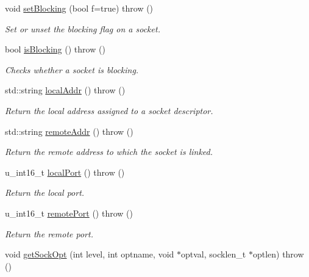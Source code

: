 \begin{CompactItemize}
void \hyperlink{classusock_1_1BaseSocket_143722edec56e119495fb8ded76582e5}{setBlocking} (bool f=true)  throw ()
\begin{CompactList}\small\item\em Set or unset the blocking flag on a socket. \item\end{CompactList}\item 
bool \hyperlink{classusock_1_1BaseSocket_d29a1fabc8b4c7a86cd236473ef03177}{isBlocking} ()  throw ()
\begin{CompactList}\small\item\em Checks whether a socket is blocking. \item\end{CompactList}\item 
std::string \hyperlink{classusock_1_1BaseSocket_479da55516dcda8117a356d8a3be3d83}{localAddr} ()  throw ()
\begin{CompactList}\small\item\em Return the local address assigned to a socket descriptor. \item\end{CompactList}\item 
std::string \hyperlink{classusock_1_1BaseSocket_3842fc1ea6ac5575e988d4ee620089a7}{remoteAddr} ()  throw ()
\begin{CompactList}\small\item\em Return the remote address to which the socket is linked. \item\end{CompactList}\item 
u\_\-int16\_\-t \hyperlink{classusock_1_1BaseSocket_47218f0ff53693f2891573ec47d84f36}{localPort} ()  throw ()
\begin{CompactList}\small\item\em Return the local port. \item\end{CompactList}\item 
u\_\-int16\_\-t \hyperlink{classusock_1_1BaseSocket_e4e09d33779e097ada03144ff54286aa}{remotePort} ()  throw ()
\begin{CompactList}\small\item\em Return the remote port. \item\end{CompactList}\item 
void \hyperlink{classusock_1_1BaseSocket_87925e8c3b89a50f8c8c2a68e0d2ab70}{getSockOpt} (int level, int optname, void $\ast$optval, socklen\_\-t $\ast$optlen)  throw ()

\end{CompactItemize}
